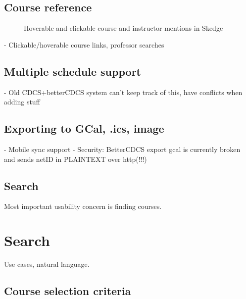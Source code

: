 \subsection{Course reference}

\begin{figure}[ht]
  \centering
  \caption{Hoverable and clickable course and instructor mentions in Skedge} \label{fig:sk-hover}
\end{figure}

- Clickable/hoverable course links, professor searches

\subsection{Multiple schedule support}

- Old CDCS+betterCDCS system can't keep track of this, have conflicts when adding stuff

\subsection{Exporting to GCal, .ics, image}

- Mobile sync support
- Security: BetterCDCS export gcal is currently broken and sends netID in PLAINTEXT over http(!!!)

\subsection{Search}

Most important usability concern is finding courses.


\section{Search}

Use cases, natural language.

\subsection{Course selection criteria}

